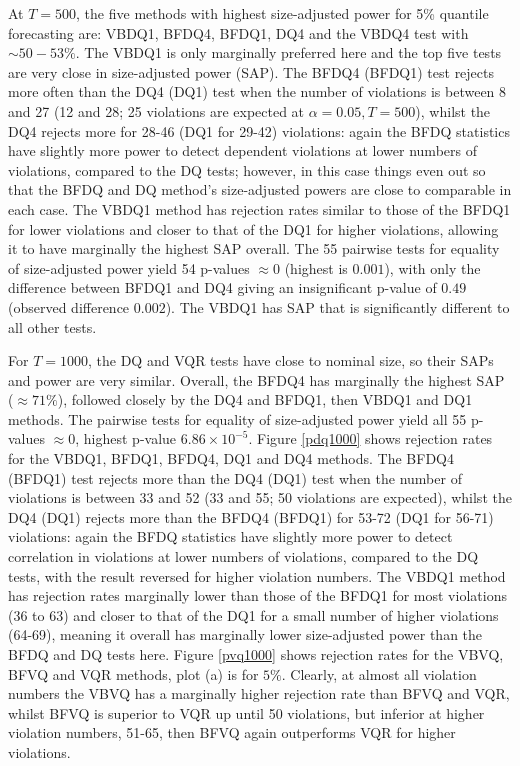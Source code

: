 \documentclass[12pt,epsf]{article}
\begin{document}
At $T=500$, the five methods with highest size-adjusted power for 5\% quantile forecasting are: VBDQ1, BFDQ4, BFDQ1, DQ4 and the VBDQ4 test
with $\sim 50-53\%$. The VBDQ1 is only marginally preferred here and the top five tests are very close in size-adjusted power (SAP).
The BFDQ4 (BFDQ1) test rejects more often than the DQ4 (DQ1) test when the number
of violations is between 8 and 27 (12 and 28; 25 violations are expected at $\alpha=0.05, T=500$), whilst the DQ4 rejects more for
28-46 (DQ1 for 29-42) violations: again the BFDQ statistics have slightly more power to detect dependent violations at lower numbers of
violations, compared to the DQ tests; however, in this case things even out so that the BFDQ and DQ method's size-adjusted powers
are close to comparable in each case. The VBDQ1 method has rejection rates similar to those of the BFDQ1 for lower violations and 
closer to that of the DQ1 for higher violations, allowing it to have marginally the highest SAP overall. The 55 pairwise tests for equality
of size-adjusted power yield 54 p-values $\approx 0$ (highest is $0.001$), with only the difference between BFDQ1 and DQ4 giving an
insignificant p-value of $0.49$ (observed difference $0.002$). The VBDQ1 has SAP that is significantly different to all other tests.

For $T=1000$, the DQ and VQR tests have close to nominal size, so their SAPs and power are very similar. Overall, the BFDQ4
has marginally the highest SAP ($\approx 71\%$), followed closely by the DQ4 and BFDQ1, then
VBDQ1 and DQ1 methods. The pairwise tests for equality of size-adjusted power yield all 55 p-values $\approx 0$, highest 
p-value $6.86 \times 10^{-5}$. Figure \ref{pdq1000} shows rejection rates for the VBDQ1, BFDQ1, BFDQ4, DQ1 and DQ4 methods.
The BFDQ4 (BFDQ1) test rejects more than the DQ4 (DQ1) test when the number of violations is between
33 and 52 (33 and 55; 50 violations are expected), whilst the DQ4 (DQ1) rejects more than the BFDQ4 (BFDQ1) for 53-72 (DQ1 for 56-71)
violations: again the BFDQ statistics have slightly more power to detect correlation in violations at lower numbers of violations, 
compared to the DQ tests, with the result reversed for higher violation numbers. The VBDQ1 method has rejection rates marginally lower than
those of the BFDQ1 for most violations (36 to 63) and closer to that of the DQ1 for a small number of higher violations (64-69),
meaning it overall has marginally lower size-adjusted power than the BFDQ and DQ tests here. Figure \ref{pvq1000} shows rejection
rates for the VBVQ, BFVQ and VQR methods, plot (a) is for $5\%$. Clearly, at almost all violation numbers the VBVQ has a
marginally higher rejection rate than BFVQ and VQR, whilst BFVQ is superior to VQR up until 50 violations, but inferior at higher 
violation numbers, 51-65, then BFVQ again outperforms VQR for higher violations.
\end{document}
